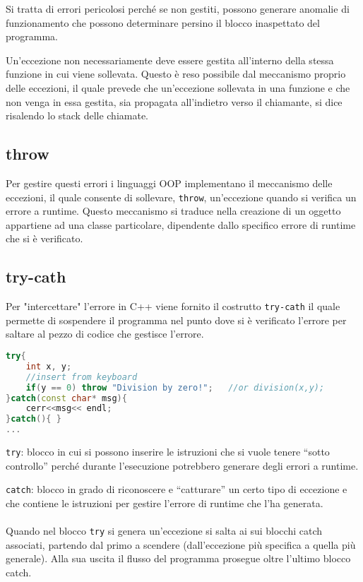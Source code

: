 Si tratta di errori pericolosi perché se non gestiti, possono generare
anomalie di funzionamento che possono determinare persino il
blocco inaspettato del programma.

Un’eccezione non necessariamente deve essere gestita all’interno
della stessa funzione in cui viene sollevata. Questo è reso possibile dal meccanismo proprio delle eccezioni, il
quale prevede che un’eccezione sollevata in una funzione e che non
venga in essa gestita, sia propagata all’indietro verso il chiamante,
si dice risalendo lo stack delle chiamate.


\subsection{throw}
Per gestire questi errori i linguaggi OOP implementano il meccanismo delle eccezioni, il quale consente di sollevare, \verb|throw|, un'eccezione quando si verifica un errore a runtime. Questo meccanismo si traduce nella creazione di un oggetto appartiene ad una classe particolare, dipendente dallo
specifico errore di runtime che si è verificato.

\subsection{try-cath}
Per "intercettare" l'errore in C++ viene fornito il costrutto \verb|try-cath| il quale permette di sospendere il programma nel punto dove si è verificato l'errore per saltare al pezzo di codice che gestisce l'errore.

\begin{lstlisting}[language=c++]
try{
    int x, y;
    //insert from keyboard
    if(y == 0) throw "Division by zero!";   //or division(x,y);
}catch(const char* msg){
    cerr<<msg<< endl;
}catch(){ }
...
\end{lstlisting}

\verb|try|:  blocco in cui si possono inserire le istruzioni che si vuole tenere “sotto controllo” perché durante l’esecuzione potrebbero generare degli errori a runtime.

\verb|catch|: blocco in grado di riconoscere e “catturare” un certo tipo di eccezione e che contiene le istruzioni per gestire l’errore di runtime che l’ha generata.
\paragraph{}
Quando nel blocco \verb|try| si genera un'eccezione si salta ai sui blocchi catch associati, partendo dal primo a scendere (dall'eccezione più specifica a quella più generale). Alla sua uscita il flusso del programma prosegue oltre l’ultimo blocco catch.


